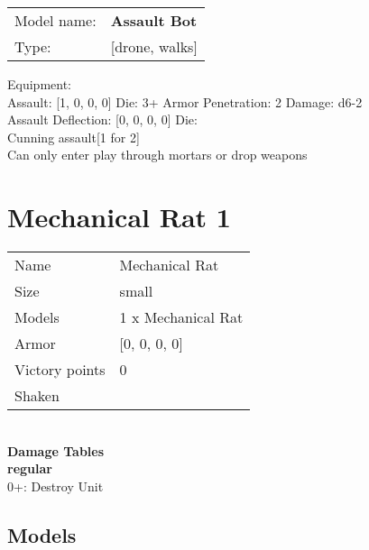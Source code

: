\begin{tabular}{ll}
Model name: & {\bf Assault Bot } \\
Type: & [drone, walks] \\
\end{tabular}

Equipment:  \\

Assault: [1, 0, 0, 0] Die: 3+ Armor Penetration: 2 Damage: d6-2 \\
Assault Deflection: [0, 0, 0, 0] Die: \\
\indent Cunning assault[1 for 2]\\ 
 

Can only enter play through mortars or drop weapons\\ 


 















\clearpage

\section{ Mechanical Rat 1 }

\begin{tabular}{ll}
  Name & Mechanical Rat \\
  Size & small\\
  Models & 1 x Mechanical Rat\\
  Armor & [0, 0, 0, 0]\\
  Victory points & 0\\
  Shaken & \\
\end{tabular}

\\ 



{\bf Damage Tables} \\
 {\bf regular } \\
0+: Destroy Unit \\


\clearpage

\subsection{ Models }

